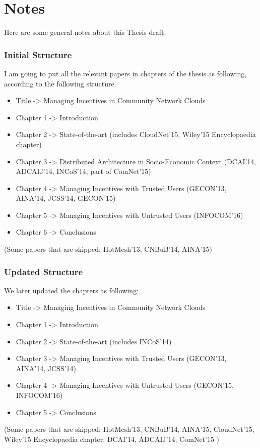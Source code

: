 

\chapter*{Notes}

Here are some general notes about this Thesis draft.

\subsection*{Initial Structure}

I am going to put all the relevant papers in chapters of the thesis as following, according to the following structure.

\begin{itemize}
	\item Title -> Managing Incentives in Community Network Clouds
	\item Chapter 1 -> Introduction
	\item Chapter 2 -> State-of-the-art (includes CloudNet'15, Wiley'15 Encyclopaedia chapter)
	\item Chapter 3 -> Distributed Architecture in Socio-Economic Context (DCAI'14, ADCAIJ'14, INCoS'14, part of ComNet'15)
	\item Chapter 4 -> Managing Incentives with Trusted Users (GECON'13, AINA'14, JCSS'14, GECON'15)
	\item Chapter 5 -> Managing Incentives with Untrusted Users (INFOCOM'16)
	\item Chapter 6 -> Conclusions
\end{itemize}

(Some papers that are skipped: HotMesh'13, CNBuB'14, AINA'15)

\subsection*{Updated Structure}

We later updated the chapters as following:

\begin{itemize}
	\item Title -> Managing Incentives in Community Network Clouds
	\item Chapter 1 -> Introduction
	\item Chapter 2 -> State-of-the-art (includes INCoS'14)
	\item Chapter 3 -> Managing Incentives with Trusted Users (GECON'13, AINA'14, JCSS'14)
	\item Chapter 4 -> Managing Incentives with Untrusted Users (GECON'15, INFOCOM'16)
	\item Chapter 5 -> Conclusions
\end{itemize}

(Some papers that are skipped: HotMesh'13, CNBuB'14, AINA'15, 
	CloudNet'15, Wiley'15 Encyclopaedia chapter, 
	DCAI'14, ADCAIJ'14, ComNet'15 %
)